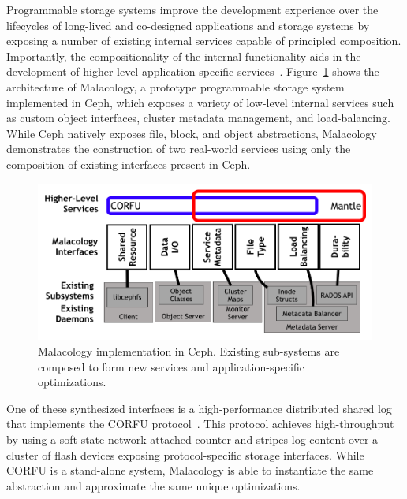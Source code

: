 
Programmable storage systems improve the development experience over the lifecycles of long-lived and co-designed applications
and storage systems by exposing a number of existing internal services capable of principled composition. Importantly, the compositionality of the internal functionality aids in the development of higher-level application specific services~\cite{sevilla:eurosys17}.
Figure~\ref{fig:malacology} shows the architecture of Malacology, a prototype programmable storage system
implemented in Ceph, which exposes a variety of low-level internal services
such as custom object interfaces, cluster metadata management, and
load-balancing. While Ceph natively exposes file, block, and object
abstractions, Malacology demonstrates the construction of two real-world
services using only the composition of existing interfaces present in Ceph.

\begin{figure}[t]
\centering
\includegraphics[width=1.0\linewidth]{implementation-overview.png}
\caption{Malacology implementation in Ceph. Existing sub-systems are composed
    to form new services and application-specific optimizations.}
\label{fig:malacology}
\end{figure}

One of these synthesized interfaces is a high-performance distributed shared
log that implements the CORFU protocol~\cite{balakrishnan:nsdi12}.
This protocol achieves high-throughput by using a soft-state network-attached
counter and stripes log content over a cluster of flash devices exposing
protocol-specific storage interfaces. While CORFU is a stand-alone system,
Malacology is able to instantiate the same abstraction and approximate 
the same unique optimizations.

